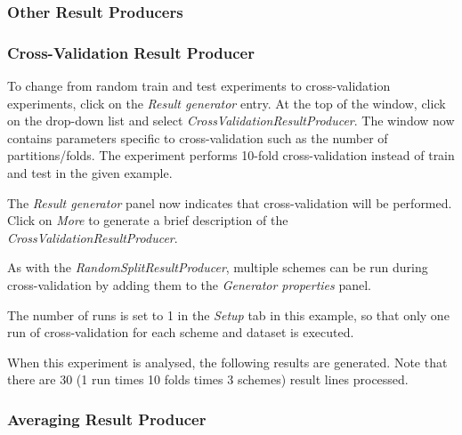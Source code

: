 \documentclass[a4paper]{article}
\begin{document}
\subsubsection{Other Result Producers}

\subsubsection*{Cross-Validation Result Producer}

To change from random train and test experiments to cross-validation experiments, click on the \textit{Result generator} entry. At the top of the window, click on the drop-down list and select \textit{CrossValidationResultProducer}. The window now contains parameters specific to cross-validation such as the number of partitions/folds. The experiment performs 10-fold cross-validation instead of train and test in the given example.
\begin{center}
\end{center}

The \textit{Result generator} panel now indicates that cross-validation will be performed. Click on \textit{More} to generate a brief description of the \textit{CrossValidationResultProducer}.
\begin{center}
\end{center}

As with the \textit{RandomSplitResultProducer}, multiple schemes can be run during cross-validation by adding them to the \textit{Generator properties} panel.
\begin{center}
\end{center}

The number of runs is set to 1 in the \textit{Setup} tab in this example, so that only one run of cross-validation for each scheme and dataset is executed.

When this experiment is analysed, the following results are generated. Note that there are 30 (1 run times 10 folds times 3 schemes) result lines processed.
\begin{center}
\end{center}


\subsubsection*{Averaging Result Producer}
\end{document}
